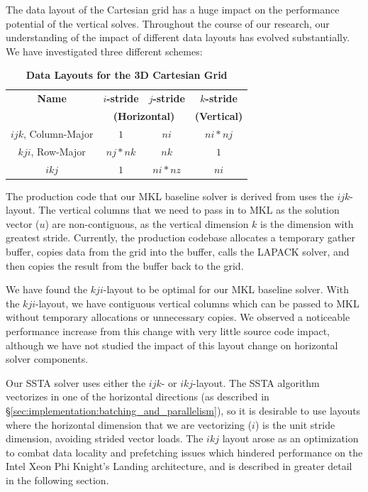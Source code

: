 \documentclass{sig-alternate-05-2015}
\begin{document}
The data layout of the Cartesian grid has a huge impact on the performance
  potential of the vertical solves.
Throughout the course of our research, our understanding of the impact of
  different data layouts has evolved substantially.
We have investigated three different schemes:
\begin{table}[h]
\centering
\caption{\textbf{Data Layouts for the 3D Cartesian Grid}}
\begin{tabular}[t]{|c|c|c|c|} \hline
\textbf{Name}         & \textbf{\(i\)-stride} & \textbf{\(j\)-stride} & \textbf{\(k\)-stride}   \\\cline{2-3}
                      & \multicolumn{2}{c|}{\textbf{(Horizontal)}}                 & \textbf{(Vertical)} \\ \hline
\(ijk\), Column-Major & \(1\)             & \(ni\)            & \(ni * nj\)         \\ \hline
\(kji\), Row-Major    & \(nj * nk\)       & \(nk\)            & \(1\)               \\ \hline
\(ikj\)               & \(1\)             & \(ni * nz\)       & \(ni\)              \\ \hline
\end{tabular}
\label{tab:implementation:data_layout:layouts}
\end{table}

The production code that our MKL baseline solver is derived from uses the
  \(ijk\)-layout.
The vertical columns that we need to pass in to MKL as the solution vector
  (\(u\)) are non-contiguous, as the vertical dimension \(k\) is the dimension
  with greatest stride.
Currently, the production codebase allocates a temporary gather buffer, copies
  data from the grid into the buffer, calls the LAPACK solver, and then copies
  the result from the buffer back to the grid.

We have found the \(kji\)-layout to be optimal for our MKL baseline solver.
With the \(kji\)-layout, we have contiguous vertical columns which can be
  passed to MKL without temporary allocations or unnecessary copies.
We observed a noticeable performance increase from this change with very
  little source code impact, although we have not studied the impact of this
  layout change on horizontal solver components.

Our SSTA solver uses either the \(ijk\)- or \(ikj\)-layout.
The SSTA algorithm vectorizes in one of the horizontal directions (as described
  in \S\ref{sec:implementation:batching_and_parallelism}), so it is desirable to
  use layouts where the horizontal dimension that we are vectorizing (\(i\)) is
  the unit stride dimension, avoiding strided vector loads.
The \(ikj\) layout arose as an optimization to combat data locality and
  prefetching issues which hindered performance on the Intel Xeon Phi Knight's
  Landing architecture, and is described in greater detail in the following
  section.
\end{document}
